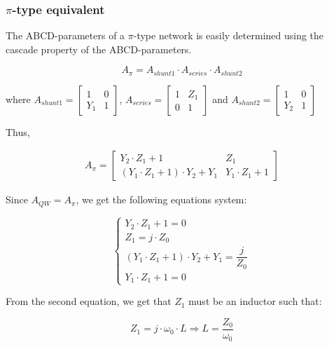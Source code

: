 \subsubsection{$\pi$-type equivalent}

\noindent The ABCD-parameters of a $\pi$-type network is easily determined using the cascade property of the ABCD-parameters.

\begin{equation}
A_{\pi} = A_{shunt1} \cdot A_{series} \cdot A_{shunt2}
\end{equation}

\noindent where $A_{shunt1} = \begin{bmatrix} 1 & 0  \\ Y_1 & 1 \end{bmatrix}$, $A_{series} = \begin{bmatrix} 1 & Z_1  \\ 0 & 1 \end{bmatrix}$ and $A_{shunt2} = \begin{bmatrix} 1 & 0  \\ Y_2 & 1 \end{bmatrix}$

\noindent Thus,

\begin{gather}
  A_{\pi} = 
 \begin{bmatrix} Y_2 \cdot Z_1 + 1 & Z_1 \\ (Y_1 \cdot Z_1 + 1) \cdot Y_2 + Y_1 & Y_1 \cdot Z_1 + 1 \end{bmatrix}
 \label{eq:pi-network-equivalent}
\end{gather}

\noindent Since $A_{QW} = A_{\pi}$, we get the following equations system:

\begin{equation}
\begin{cases} Y_2 \cdot Z_1 + 1 = 0\\ Z_1 = j\cdot Z_0 \\ (Y_1 \cdot Z_1 + 1) \cdot Y_2 + Y_1 = \dfrac{j}{Z_0} \\ Y_1 \cdot Z_1 + 1 = 0\end{cases} 
\end{equation}

\noindent From the second equation, we get that $Z_1$ must be an inductor such that:

\begin{equation}
Z_1 = j\cdot \omega_0 \cdot L \Longrightarrow L = \dfrac{Z_0}{\omega_0}
\end{equation}

